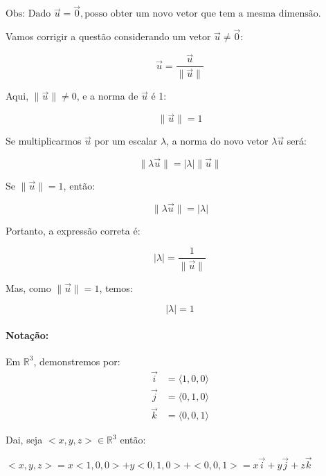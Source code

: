 $\text{Obs: Dado } \vec{u} = \vec{0}, \text{posso obter um novo vetor que tem a mesma dimensão.}$


Vamos corrigir a questão considerando um vetor \(\vec{u} \neq \vec{0}\):

\[
\vec{u} = \frac{\vec{u}}{\|\vec{u}\|}
\]

Aqui, \(\|\vec{u}\| \neq 0\), e a norma de \(\vec{u}\) é 1:

\[
\|\vec{u}\| = 1
\]

Se multiplicarmos \(\vec{u}\) por um escalar \(\lambda\), a norma do novo vetor \(\lambda \vec{u}\) será:

\[
\|\lambda \vec{u}\| = |\lambda| \|\vec{u}\|
\]

Se \(\|\vec{u}\| = 1\), então:

\[
\|\lambda \vec{u}\| = |\lambda|
\]

Portanto, a expressão correta é:

\[
|\lambda| = \frac{1}{\|\vec{u}\|}
\]

Mas, como \(\|\vec{u}\| = 1\), temos:

\[
|\lambda| = 1
\]

\paragraph{Notação:}
Em $\mathbb{R}^3$, demonstremos por:
\begin{align*}
    \vec{i} &= \langle 1, 0, 0 \rangle \\
    \vec{j} &= \langle 0, 1, 0 \rangle \\
    \vec{k} &= \langle 0, 0, 1 \rangle
\end{align*}

Dai, seja $<x, y, z> \in \mathbb{R}^3$ então:

$< x,y,z > = x<1,0,0> + y <0,1,0> + <0,0,1> = x\vec{i} + y \vec{j} + z \vec{k}$



